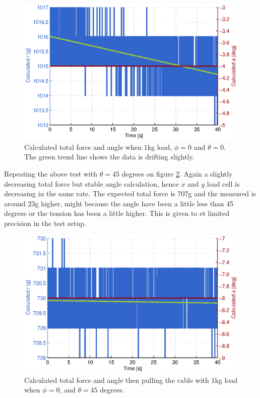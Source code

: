 \begin{figure}[hbtp]
\centering
\includegraphics[scale=1]{graphics/gcs_test/theta0phi0deg1kgCable.eps}
\caption[Total force and angle when $1$kg load, $\phi=0$ and $\theta=0$]{Calculated total force and angle when $1$kg load, $\phi=0$ and $\theta=0$. The green trend line shows the data is drifting slightly.}
\label{fig:theta0phi0deg1kgCable}
\end{figure}

\newpage
\noindent
Repeating the above test with $\theta=45$ degrees on figure \ref{fig:theta45phi0deg1kgCable}. Again a slightly decreasing total force but stable angle calculation, hence $x$ and $y$ load cell is decreasing in the same rate. The expected total force is $707$g and the measured is around $23$g higher, might because the angle have been a little less than 45 degrees or the tension has been a little higher. This is given to et limited precision in the test setup.


\begin{figure}[hbtp]
\centering
\includegraphics[scale=1]{graphics/gcs_test/theta45phi0deg1kgCable.eps}
\caption[Calculated total force and angle, 1kg load, $\phi=0$, and $\theta=45$ degrees.]{Calculated total force and angle then pulling the cable with 1kg load when $\phi=0$, and $\theta=45$ degrees.}
\label{fig:theta45phi0deg1kgCable}
\end{figure}




